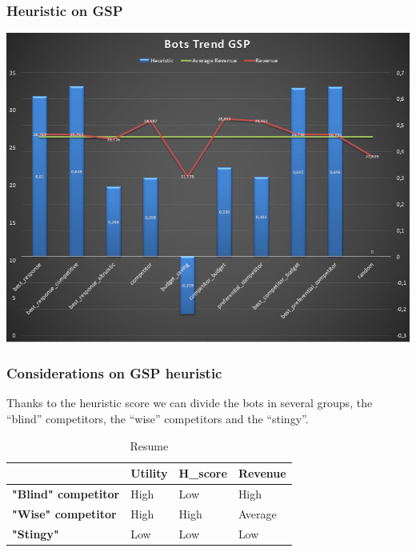 \documentclass{beamer}
\begin{document}
\begin{frame}
\frametitle{Heuristic on GSP}
\begin{center}
\includegraphics[scale=0.46]{img/Auctions/GSP_all_Heuristic.PNG} 
\end{center}
\end{frame}

\begin{frame}
\frametitle{Considerations on GSP heuristic}
Thanks to the heuristic score  we can divide the bots in several groups, the ``blind'' competitors, the ``wise'' competitors and  the ``stingy''.\\
\begin{table}[]
\centering
\begin{tabular}{l|l|l|l|}
\cline{2-4}
                                                  & \textbf{Utility} & \textbf{H\_score} & \textbf{Revenue} \\ \hline
\multicolumn{1}{|l|}{\textbf{"Blind" competitor}} & High             & Low               & High             \\ \hline
\multicolumn{1}{|l|}{\textbf{"Wise" competitor}}  & High             & High              & Average          \\ \hline
\multicolumn{1}{|l|}{\textbf{"Stingy"}}           & Low              & Low               & Low              \\ \hline
\end{tabular}
\caption{Resume}
\label{my-label}
\end{table}
\end{frame}
\end{document}
